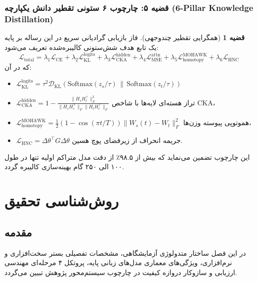 \documentclass[12pt,a4paper]{report}
\theoremstyle{definition}
\newtheorem{theorem}{قضیه}[chapter]
\begin{document}
\subsection{قضیه ۵: چارچوب ۶ ستونی تقطیر دانش یکپارچه (6-Pillar Knowledge Distillation)}
\begin{theorem}[همگرایی تقطیر چندوجهی]
\label{thm:six_pillar_kd}
فاز بازیابی گرادیانی سریع در این رساله بر پایه یک تابع هدف شش‌ستونی کالیبره‌شده تعریف می‌شود:
\begin{equation}
\mathcal{L}_{\text{total}} = \lambda_1 \mathcal{L}_{\text{CE}} + \lambda_2 \mathcal{L}_{\text{KL}}^{\text{logits}} + \lambda_3 \mathcal{L}_{\text{CKA}}^{\text{hidden}} + \lambda_4 \mathcal{L}_{\text{MSE}}^{\text{attn}} + \lambda_5 \mathcal{L}_{\text{homotopy}}^{\text{MOHAWK}} + \lambda_6 \mathcal{L}_{\text{HNC}}
\end{equation}
که در آن:
\begin{itemize}
    \item $\mathcal{L}_{\text{KL}}^{\text{logits}} = \tau^2 \mathcal{D}_{\text{KL}}\left(\text{Softmax}(z_s/\tau) \,\|\, \text{Softmax}(z_t/\tau)\right)$
    \item $\mathcal{L}_{\text{CKA}}^{\text{hidden}} = 1 - \frac{\| H_s H_t^\top \|_F^2}{\| H_s H_s^\top \|_F \| H_t H_t^\top \|_F}$ تراز هسته‌ای لایه‌ها با شاخص CKA،
    \item $\mathcal{L}_{\text{homotopy}}^{\text{MOHAWK}} = \frac{1}{2} (1 - \cos(\pi t / T)) \| W_s(t) - W_t \|_F^2$ هموتوپی پیوسته وزن‌ها،
    \item $\mathcal{L}_{\text{HNC}} = \Delta \theta^\top G \Delta \theta$ جریمه انحراف از زیرفضای پوچ هسین.
\end{itemize}
این چارچوب تضمین می‌نماید که بیش از ۹۸.۵٪ از دقت مدل متراکم اولیه تنها در طول ۱۰۰ الی ۲۵۰ گام بهینه‌سازی کالیبره گردد.
\end{theorem}

\chapter{روش‌شناسی تحقیق}
\label{chap:methodology}

\section{مقدمه}
در این فصل ساختار متدولوژی آزمایشگاهی، مشخصات تفصیلی بستر سخت‌افزاری و نرم‌افزاری، ویژگی‌های معماری مدل‌های زبانی پایه، پروتکل ۴ مرحله‌ای مهندسی ارزیابی و سازوکار دروازه کیفیت  در چارچوب سیستم‌محور پژوهش تبیین می‌گردد.
\end{document}
